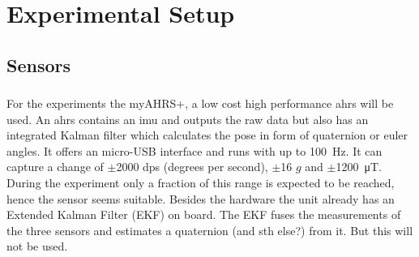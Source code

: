 \chapter{Experimental Setup}
\label{ch:ExperimentalSetup}

\section{Sensors}
\subsection{}
For the experiments the myAHRS+, a low cost high performance \acrfull{ahrs} will be used.
An \acrshort{ahrs} contains an \acrshort{imu} and outputs the raw data but also has an integrated Kalman filter which calculates the pose in form of quaternion or euler angles.
It offers an micro-USB interface and runs with up to \SI{100}{\Hz}.
It can capture a change of $\pm$2000 dps (degrees per second), $\pm$16 $g$ and $\pm$\SI{1200}{\micro\tesla}.
During the experiment only a fraction of this range is expected to be reached, hence the sensor seems suitable.
Besides the hardware the unit already has an Extended Kalman Filter (EKF) on board.
The EKF fuses the measurements of the three sensors and estimates a quaternion (and sth else?) from it.
But this will not be used.


